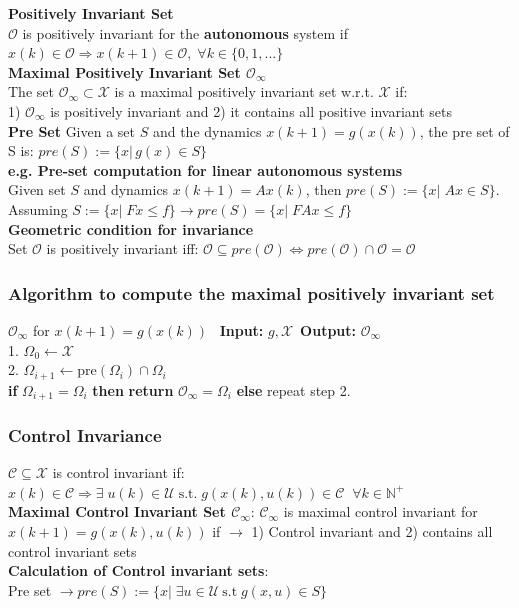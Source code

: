 \textbf{Positively Invariant Set}\\ $\mathcal{O}$ is positively invariant for the \textbf{autonomous} system if $x(k)\in \mathcal{O} \Rightarrow x(k+1)\in \mathcal{O},\;\forall k\in\{0,1,...\}$\\
\textbf{Maximal Positively Invariant Set $\mathcal{O}_{\infty}$}\\
The set $\mathcal{O}_\infty\subset\mathcal{X}$ is a maximal positively invariant set w.r.t. $\mathcal{X}$ if:\\ 1) $\mathcal{O}_\infty$ is positively invariant and 2) it contains all positive invariant sets\\
\textbf{Pre Set} Given a set $S$ and the dynamics $x(k+1)=g(x(k))$, the pre set of S is: $pre(S):=\{x|\,g(x)\in S\}$\\
\textbf{e.g. Pre-set computation for linear autonomous systems}\\
Given set $S$ and dynamics $x(k+1)=Ax(k)$, then $pre(S):=\{x|\;Ax\in S\}$.\\
Assuming $S:=\{x|\;Fx\leq f\}\rightarrow pre(S)=\{x|\;FAx\leq f\}$\\
\textbf{Geometric condition for invariance}\\
Set $\mathcal{O}$ is positively invariant iff: $\mathcal{O}\subseteq pre(\mathcal{O}) \Leftrightarrow pre(\mathcal{O})\cap\mathcal{O}=\mathcal{O}$\\

\subsubsection{Algorithm to compute the maximal positively invariant set} $\mathcal{O}_\infty$ for $x(k+1)=g(x(k))$ \, \textbf{Input:} $g, \mathcal{X}$\, \textbf{Output:} $\mathcal{O}_\infty$\\
1. $\Omega_0 \leftarrow \mathcal{X}$\\
2. $\Omega_{i+1} \leftarrow \text{pre}(\Omega_i) \cap \Omega_i$\\
\hspace*{1em} \textbf{if} $\Omega_{i+1} = \Omega_i$ \textbf{then} \textbf{return} $\mathcal{O}_\infty = \Omega_i$ \textbf{else} repeat step 2.

\subsubsection{Control Invariance}
$\mathcal{C}\subseteq\mathcal{X}$ is control invariant if: $x(k)\in\mathcal{C}\Rightarrow\exists\;u(k)\in\mathcal{U}\; \text{s.t.}\;g(x(k),u(k))\in\mathcal{C}\;\;\forall k\in \mathbb{N}^+$\\
\textbf{Maximal Control Invariant Set $\mathcal{C_\infty}$}: $\mathcal{C}_\infty$ is maximal control invariant for $x(k+1)=g(x(k),u(k))$ if $\rightarrow$ 1) Control invariant and 2) contains all control invariant sets\\
\textbf{Calculation of Control invariant sets}:\\
Pre set $\rightarrow pre(S):=\{x|\;\exists u\in \mathcal{U}\ \text{s.t}\;g(x,u)\in S\}$\\

